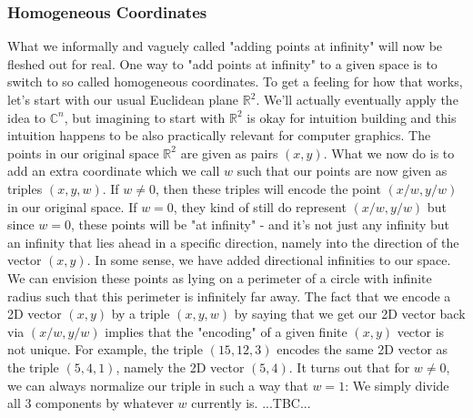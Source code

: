\subsubsection{Homogeneous Coordinates}
What we informally and vaguely called "adding points at infinity" will now be fleshed out for real. One way to "add points at infinity" to a given space is to switch to so called homogeneous coordinates. To get a feeling for how that works, let's start with our usual Euclidean plane $\mathbb{R}^2$. We'll actually eventually apply the idea to $\mathbb{C}^n$, but imagining to start with $\mathbb{R}^2$ is okay for intuition building and this intuition happens to be also practically relevant for computer graphics. The points in our original space $\mathbb{R}^2$ are given as pairs $(x,y)$. What we now do is to add an extra coordinate which we call $w$ such that our points are now given as triples $(x, y, w)$. If $w \neq 0$, then these triples will encode the point $(x/w, y/w)$ in our original space. If $w=0$, they kind of still do represent $(x/w, y/w)$ but since $w = 0$, these points will be "at infinity" - and it's not just any infinity but an infinity that lies ahead in a specific direction, namely into the direction of the vector $(x,y)$. In some sense, we have added directional infinities to our space. We can envision these points as lying on a perimeter of a circle with infinite radius such that this perimeter is infinitely far away. The fact that we encode a 2D vector $(x,y)$ by a triple $(x,y,w)$ by saying that we get our 2D vector back via $(x/w, y/w)$ implies that the "encoding" of a given finite $(x,y)$ vector is not unique. For example, the triple $(15,12,3)$ encodes the same 2D vector as the triple $(5,4,1)$, namely the 2D vector $(5,4)$. It turns out that for $w \neq 0$, we can always normalize our triple in such a way that $w=1$: We simply divide all 3 components by whatever $w$ currently is.
...TBC...



